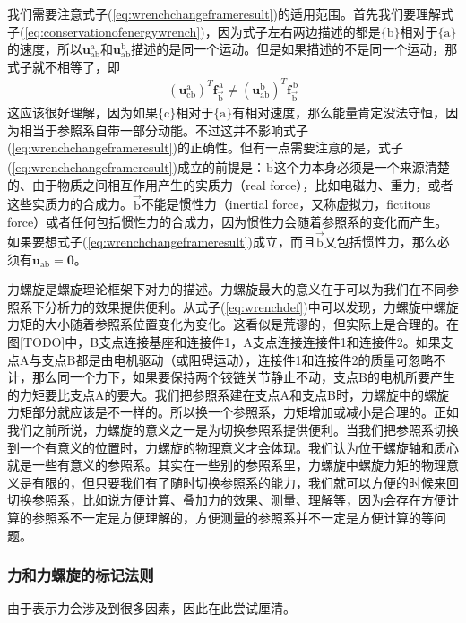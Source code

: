 \documentclass[12pt, a4paper, article, UTF8]{ctexart}
\begin{document}
我们需要注意式子(\ref{eq:wrenchchangeframeresult})的适用范围。首先我们要理解式子(\ref{eq:conservationofenergywrench})，因为式子左右两边描述的都是$\{\text{b}\}$相对于$\{\text{a}\}$的速度，所以$\mathbf{u}_\text{ab}^\text{a}$和$\mathbf{u}_\text{ab}^\text{b}$描述的是同一个运动。但是如果描述的不是同一个运动，那式子就不相等了，即
\begin{align}
(\mathbf{u}_\text{cb}^\text{a})^T \mathbf{f}_{\vec{\text{b}}}^{\,\text{a}} \neq (\mathbf{u}_\text{ab}^\text{b})^T \mathbf{f}_{\vec{\text{b}}}^{\,\text{b}}
\end{align}
这应该很好理解，因为如果$\{\text{c}\}$相对于$\{\text{a}\}$有相对速度，那么能量肯定没法守恒，因为相当于参照系自带一部分动能。不过这并不影响式子(\ref{eq:wrenchchangeframeresult})的正确性。但有一点需要注意的是，式子(\ref{eq:wrenchchangeframeresult})成立的前提是：$\vec{\text{b}}$这个力本身必须是一个来源清楚的、由于物质之间相互作用产生的实质力（real force），比如电磁力、重力，或者这些实质力的合成力。$\vec{\text{b}}$不能是惯性力（inertial force，又称虚拟力，fictitous force）或者任何包括惯性力的合成力，因为惯性力会随着参照系的变化而产生。如果要想式子(\ref{eq:wrenchchangeframeresult})成立，而且$\vec{\text{b}}$又包括惯性力，那么必须有$\mathbf{u}_\text{ab} = \mathbf{0}$。

力螺旋是螺旋理论框架下对力的描述。力螺旋最大的意义在于可以为我们在不同参照系下分析力的效果提供便利。从式子(\ref{eq:wrenchdef})中可以发现，力螺旋中螺旋力矩的大小随着参照系位置变化为变化。这看似是荒谬的，但实际上是合理的。在图[TODO]中，B支点连接基座和连接件1，A支点连接连接件1和连接件2。如果支点A与支点B都是由电机驱动（或阻碍运动），连接件1和连接件2的质量可忽略不计，那么同一个力下，如果要保持两个铰链关节静止不动，支点B的电机所要产生的力矩要比支点A的要大。我们把参照系建在支点A和支点B时，力螺旋中的螺旋力矩部分就应该是不一样的。所以换一个参照系，力矩增加或减小是合理的。正如我们之前所说，力螺旋的意义之一是为切换参照系提供便利。当我们把参照系切换到一个有意义的位置时，力螺旋的物理意义才会体现。我们认为位于螺旋轴和质心就是一些有意义的参照系。其实在一些别的参照系里，力螺旋中螺旋力矩的物理意义是有限的，但只要我们有了随时切换参照系的能力，我们就可以方便的时候来回切换参照系，比如说方便计算、叠加力的效果、测量、理解等，因为会存在方便计算的参照系不一定是方便理解的，方便测量的参照系并不一定是方便计算的等问题。

\subsubsection{力和力螺旋的标记法则}
由于表示力会涉及到很多因素，因此在此尝试厘清。
\end{document}
